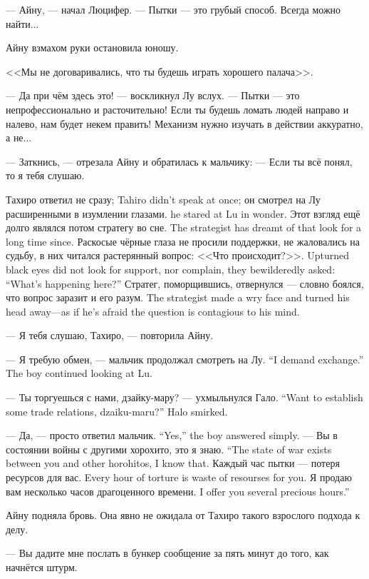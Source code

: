 --- Айну, --- начал Люцифер.
--- Пытки --- это грубый способ.
Всегда можно найти...

Айну взмахом руки остановила юношу.

<<Мы не договаривались, что ты будешь играть хорошего палача>>.

--- Да при чём здесь это! --- воскликнул Лу вслух.
--- Пытки --- это непрофессионально и расточительно!
Если ты будешь ломать людей направо и налево, нам будет некем править!
Механизм нужно изучать в действии аккуратно, а не...

--- Заткнись, --- отрезала Айну и обратилась к мальчику:
--- Если ты всё понял, то я тебя слушаю.

{Тахиро ответил не сразу;}
{Tahiro didn't speak at once;}
{он смотрел на Лу расширенными в изумлении глазами.}
{he stared at Lu in wonder.}
{Этот взгляд ещё долго являлся потом стратегу во сне.}
{The strategist has dreamt of that look for a long time since. }
{Раскосые чёрные глаза не просили поддержки, не жаловались на судьбу, в них читался растерянный вопрос: <<Что происходит?>>.}
{Upturned black eyes did not look for support, nor complain, they bewilderedly asked: ``What's happening here?''}
{Стратег, поморщившись, отвернулся --- словно боялся, что вопрос заразит и его разум.}
{The strategist made a wry face and turned his head away---as if he's afraid the question is contagious to his mind.}

--- Я тебя слушаю, Тахиро, --- повторила Айну.

{--- Я требую обмен, --- мальчик продолжал смотреть на Лу.}
{``I demand exchange.'' The boy continued looking at Lu.}

{--- Ты торгуешься с нами, дзайку-мару? --- ухмыльнулся Гало.}
{``Want to establish some trade relations, dzaiku-maru?'' Halo smirked.}

{--- Да, --- просто ответил мальчик.}
{``Yes,'' the boy answered simply.}
{--- Вы в состоянии войны с другими хорохито, это я знаю.}
{``The state of war exists between you and other horohitos, I know that.}
{Каждый час пытки --- потеря ресурсов для вас.}
{Every hour of torture is waste of resourses for you.}
{Я продаю вам несколько часов драгоценного времени.}
{I offer you several precious hours.''}

Айну подняла бровь.
Она явно не ожидала от Тахиро такого взрослого подхода к делу.

--- Вы дадите мне послать в бункер сообщение за пять минут до того, как начнётся штурм.

